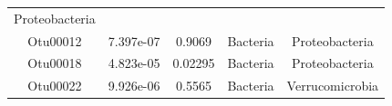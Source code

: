 \documentclass[]{article}
\begin{document}
\begin{longtable}[]{@{}ccccc@{}}
\begin{minipage}[t]{0.20\columnwidth}
Proteobacteria\strut
\end{minipage}\tabularnewline
\begin{minipage}[t]{0.13\columnwidth}\centering\strut
Otu00012\strut
\end{minipage} & \begin{minipage}[t]{0.14\columnwidth}\centering\strut
7.397e-07\strut
\end{minipage} & \begin{minipage}[t]{0.12\columnwidth}\centering\strut
0.9069\strut
\end{minipage} & \begin{minipage}[t]{0.13\columnwidth}\centering\strut
Bacteria\strut
\end{minipage} & \begin{minipage}[t]{0.20\columnwidth}\centering\strut
Proteobacteria\strut
\end{minipage}\tabularnewline
\begin{minipage}[t]{0.13\columnwidth}\centering\strut
Otu00018\strut
\end{minipage} & \begin{minipage}[t]{0.14\columnwidth}\centering\strut
4.823e-05\strut
\end{minipage} & \begin{minipage}[t]{0.12\columnwidth}\centering\strut
0.02295\strut
\end{minipage} & \begin{minipage}[t]{0.13\columnwidth}\centering\strut
Bacteria\strut
\end{minipage} & \begin{minipage}[t]{0.20\columnwidth}\centering\strut
Proteobacteria\strut
\end{minipage}\tabularnewline
\begin{minipage}[t]{0.13\columnwidth}\centering\strut
Otu00022\strut
\end{minipage} & \begin{minipage}[t]{0.14\columnwidth}\centering\strut
9.926e-06\strut
\end{minipage} & \begin{minipage}[t]{0.12\columnwidth}\centering\strut
0.5565\strut
\end{minipage} & \begin{minipage}[t]{0.13\columnwidth}\centering\strut
Bacteria\strut
\end{minipage} & \begin{minipage}[t]{0.20\columnwidth}\centering\strut
Verrucomicrobia\strut
\end{minipage}\tabularnewline

\end{longtable}
\end{document}
